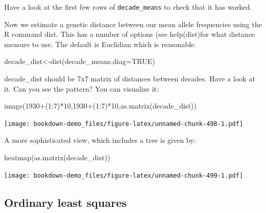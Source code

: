\documentclass[
]{book}
\newenvironment{Shaded}{\begin{snugshade}}{\end{snugshade}}
\newcommand{\AttributeTok}[1]{\textcolor[rgb]{0.77,0.63,0.00}{#1}}
\newcommand{\ConstantTok}[1]{\textcolor[rgb]{0.00,0.00,0.00}{#1}}
\newcommand{\DecValTok}[1]{\textcolor[rgb]{0.00,0.00,0.81}{#1}}
\newcommand{\FunctionTok}[1]{\textcolor[rgb]{0.00,0.00,0.00}{#1}}
\newcommand{\NormalTok}[1]{#1}
\newcommand{\OtherTok}[1]{\textcolor[rgb]{0.56,0.35,0.01}{#1}}
\newcommand{\SpecialCharTok}[1]{\textcolor[rgb]{0.00,0.00,0.00}{#1}}
\begin{document}
Have a look at the first few rows of \texttt{decade\_means} to check that it has worked.

Now we estimate a genetic distance between our mean allele frequencies using the R command dist. This has a number of options (see help(dist)for what distance measure to use. The default is Euclidian which is reasonable.

\begin{Shaded}
\begin{Highlighting}[]
\NormalTok{decade\_dist}\OtherTok{\textless{}{-}}\FunctionTok{dist}\NormalTok{(decade\_means,}\AttributeTok{diag=}\ConstantTok{TRUE}\NormalTok{)}
\end{Highlighting}
\end{Shaded}

decade\_dist should be 7x7 matrix of distances between decades. Have a look at it. Can you
see the pattern? You can visualize it:

\begin{Shaded}
\begin{Highlighting}[]
\FunctionTok{image}\NormalTok{(}\DecValTok{1930}\SpecialCharTok{+}\NormalTok{(}\DecValTok{1}\SpecialCharTok{:}\DecValTok{7}\NormalTok{)}\SpecialCharTok{*}\DecValTok{10}\NormalTok{,}\DecValTok{1930}\SpecialCharTok{+}\NormalTok{(}\DecValTok{1}\SpecialCharTok{:}\DecValTok{7}\NormalTok{)}\SpecialCharTok{*}\DecValTok{10}\NormalTok{,}\FunctionTok{as.matrix}\NormalTok{(decade\_dist))}
\end{Highlighting}
\end{Shaded}

\texttt{[image: bookdown-demo\_files/figure-latex/unnamed-chunk-498-1.pdf]}

A more sophisticated view, which includes a tree is given by:

\begin{Shaded}
\begin{Highlighting}[]
\FunctionTok{heatmap}\NormalTok{(}\FunctionTok{as.matrix}\NormalTok{(decade\_dist))}
\end{Highlighting}
\end{Shaded}

\texttt{[image: bookdown-demo\_files/figure-latex/unnamed-chunk-499-1.pdf]}

\hypertarget{ordinary-least-squares}{%
\subsection{Ordinary least squares}\label{ordinary-least-squares}}
\end{document}
